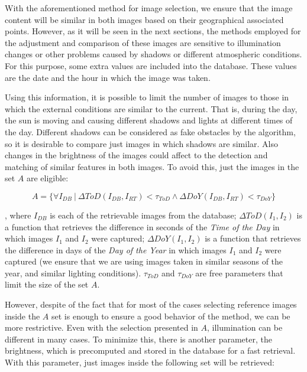 With the aforementioned method for image selection, we ensure that the image content will be similar in both images based on their geographical associated points. However, as it will be seen in the next sections, the methods employed for the adjustment and comparison of these images are sensitive to illumination changes or other problems caused by shadows or different atmospheric conditions. For this purpose, some extra values are included into the database. These values are the date and the hour in which the image was taken.

Using this information, it is possible to limit the number of images to those in which the external conditions are similar to the current. That is, during the day, the sun is moving and causing different shadows and lights at different times of the day. Different shadows can be considered as fake obstacles by the algorithm, so it is desirable to compare just images in which shadows are similar. Also changes in the brightness of the images could affect to the detection and matching of similar features in both images. To avoid this, just the images in the set $A$ are eligible:

\begin{equation}\label{eq:cp01_eligible_images_by_time}
A = \{ \forall I_{DB} ~|~ \Delta ToD(I_{DB}, I_{RT}) < \tau_{ToD} \wedge \Delta DoY(I_{DB}, I_{RT}) < \tau_{DoY} \}
\end{equation}

, where $I_{DB}$ is each of the retrievable images from the database; $\Delta ToD(I_1, I_2)$ is a function that retrieves the difference in seconds of the \emph{Time of the Day} in which images $I_1$ and $I_2$ were captured; $\Delta DoY(I_1, I_2)$ is a function that retrieves the difference in days of the \emph{Day of the Year} in which images $I_1$ and $I_2$ were captured (we ensure that we are using images taken in similar seasons of the year, and similar lighting conditions). $\tau_{ToD}$ and $\tau_{DoY}$ are free parameters that limit the size of the set $A$.

However, despite of the fact that for most of the cases selecting reference images inside the $A$ set is enough to ensure a good behavior of the method, we can be more restrictive. Even with the selection presented in $A$, illumination can be different in many cases. To minimize this, there is another parameter, the brightness, which is precomputed and stored in the database for a fast retrieval. With this parameter, just images inside the following set will be retrieved:

